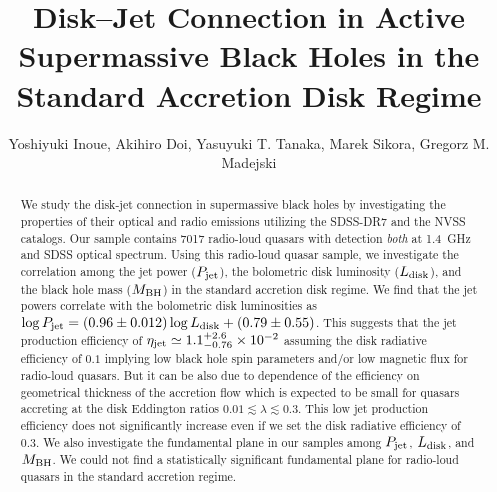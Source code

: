 \documentclass[preprint2,twocolappendix]{aastex6}
\begin{document}
\title{Disk--Jet Connection in Active Supermassive Black Holes in the Standard Accretion Disk Regime} 

\author{Yoshiyuki Inoue, Akihiro Doi, Yasuyuki T. Tanaka, Marek Sikora, Gregorz M. Madejski} 



\begin{abstract}
We study the disk-jet connection in supermassive black holes by investigating the properties of their optical and radio emissions utilizing the SDSS-DR7 and the NVSS catalogs. Our sample contains 7017 radio-loud quasars with detection {\it both} at 1.4~GHz and SDSS optical spectrum. Using this radio-loud quasar sample, we investigate the correlation among the jet power ($P_{\rm jet}$), the bolometric disk luminosity ($L_{\rm disk}$), and the black hole mass ($M_{\rm BH}$) in the standard accretion disk regime. We find that the jet powers correlate with the bolometric disk luminosities as $\log P_{\rm jet} = (0.96\pm0.012)\log L_{\rm disk} + (0.79 \pm 0.55)$. This suggests that the jet production efficiency of $\eta_{\rm jet}\simeq1.1_{-0.76}^{+2.6}\times10^{-2}$ assuming the disk radiative efficiency of $0.1$ implying low black hole spin parameters and/or low magnetic flux for radio-loud quasars. But it can be also due to dependence of the efficiency on geometrical thickness of the accretion flow which is expected to be small for quasars accreting at the disk Eddington ratios $0.01 \lesssim \lambda \lesssim 0.3$. This low jet production efficiency does not significantly increase even if we set the disk radiative efficiency of $0.3$. We also investigate the fundamental plane in our samples among $P_{\rm jet}$, $L_{\rm disk}$, and $M_{\rm BH}$. We could not find a statistically significant fundamental plane for radio-loud quasars in the standard accretion regime.
\end{abstract}
\end{document}
